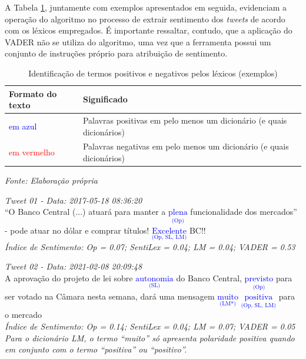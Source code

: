 A Tabela \ref{tab: termos_pos_neg_lexicos}, juntamente com exemplos apresentados em seguida, evidenciam a operação do algoritmo no processo de extrair sentimento dos \textit{tweets} de acordo com os léxicos empregados. É importante ressaltar, contudo, que a aplicação do VADER não se utiliza do algoritmo, uma vez que a ferramenta possui um conjunto de instruções próprio para atribuição de sentimento. 


\begin{table}[h]
\centering
\caption{Identificação de termos positivos e negativos pelos léxicos (exemplos)}
\label{tab: termos_pos_neg_lexicos}
\begin{adjustbox}{max width=\textwidth}
    \begin{tabular}{|l|l|}
    \hline
    \rowcolor[HTML]{EFEFEF} 
    \textbf{Formato do texto} & \textbf{Significado} \\ \hline
    \textcolor{blue}{em azul} & Palavras positivas em pelo menos um dicionário (e quais dicionários)\\ \hline
    \textcolor{red}{em vermelho} & Palavras negativas em pelo menos um dicionário (e quais dicionários)\\ \hline
    \end{tabular}
\end{adjustbox}
\vspace{0.2cm}
\par\noindent
    \begin{minipage}{\textwidth}
        \centering
        \footnotesize %
        \textit{Fonte: Elaboração própria}
    \end{minipage}
\end{table}

\bigskip


\textit{Tweet 01 - Data: 2017-05-18 08:36:20} \\
\enquote{O Banco Central (...) atuará para manter a \textcolor{blue}{$\underset{\text{(Op)}}{\text{plena}}$} funcionalidade dos mercados} - pode atuar no dólar e comprar títulos! \textcolor{blue}{$\underset{\text{(Op, SL, LM)}}{\text{Excelente}}$} BC!! \\
\textit{\small Índice de Sentimento: Op = 0.07; SentiLex = 0.04; LM = 0.04; VADER = 0.53}

\bigskip
\bigskip

\textit{Tweet 02 - Data: 2021-02-08 20:09:48	} \\
A aprovação do projeto de lei sobre \textcolor{blue}{$\underset{\text{(SL)}}{\text{autonomia}}$} do Banco Central, \textcolor{blue}{$\underset{\text{(Op)}}{\text{previsto}}$} para ser votado na Câmara nesta semana, dará uma mensagem \textcolor{blue}{$\underset{\text{(LM*)}}{\text{muito}}$} \textcolor{blue}{$\underset{\text{(Op, SL, LM)}}{\text{positiva}}$} para o mercado	\\
\textit{\small Índice de Sentimento: Op = 0.14; SentiLex = 0.04; LM = 0.07; VADER = 0.05} \\
{\textit{\small *Para o dicionário LM, o termo \enquote{muito} só apresenta polaridade positiva quando em conjunto com o termo \enquote{positiva} ou \enquote{positivo}.}}

